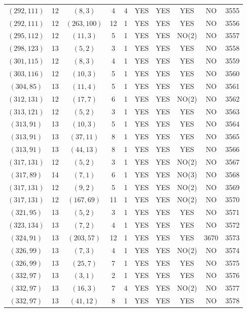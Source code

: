 \begin{longtable}{|c|c|c|c|c|c|c|c|c|c|}
$(292, 111)$ & 12 & $(8, 3)$ & 4 & 4 & YES & YES & YES & NO & 3555\\
$(292, 111)$ & 12 & $(263, 100)$ & 12 & 1 & YES & YES & YES & NO & 3556\\
$(295, 112)$ & 12 & $(11, 3)$ & 5 & 1 & YES & YES & NO(2) & NO & 3557\\
$(298, 123)$ & 13 & $(5, 2)$ & 3 & 1 & YES & YES & YES & NO & 3558\\
$(301, 115)$ & 12 & $(8, 3)$ & 4 & 1 & YES & YES & YES & NO & 3559\\
$(303, 116)$ & 12 & $(10, 3)$ & 5 & 1 & YES & YES & YES & NO & 3560\\
$(304, 85)$ & 13 & $(11, 4)$ & 5 & 1 & YES & YES & YES & NO & 3561\\
$(312, 131)$ & 12 & $(17, 7)$ & 6 & 1 & YES & YES & NO(2) & NO & 3562\\
$(313, 121)$ & 12 & $(5, 2)$ & 3 & 1 & YES & YES & YES & NO & 3563\\
$(313, 91)$ & 13 & $(10, 3)$ & 5 & 1 & YES & YES & YES & NO & 3564\\
$(313, 91)$ & 13 & $(37, 11)$ & 8 & 1 & YES & YES & YES & NO & 3565\\
$(313, 91)$ & 13 & $(44, 13)$ & 8 & 1 & YES & YES & YES & NO & 3566\\
$(317, 131)$ & 12 & $(5, 2)$ & 3 & 1 & YES & YES & NO(2) & NO & 3567\\
$(317, 89)$ & 14 & $(7, 1)$ & 6 & 1 & YES & YES & NO(3) & NO & 3568\\
$(317, 131)$ & 12 & $(9, 2)$ & 5 & 1 & YES & YES & NO(2) & NO & 3569\\
$(317, 131)$ & 12 & $(167, 69)$ & 11 & 1 & YES & YES & NO(2) & NO & 3570\\
$(321, 95)$ & 13 & $(5, 2)$ & 3 & 1 & YES & YES & YES & NO & 3571\\
$(323, 134)$ & 13 & $(7, 2)$ & 4 & 1 & YES & YES & YES & NO & 3572\\
$(324, 91)$ & 13 & $(203, 57)$ & 12 & 1 & YES & YES & YES & 3670 & 3573\\
$(326, 99)$ & 13 & $(7, 3)$ & 4 & 1 & YES & YES & NO(2) & NO & 3574\\
$(326, 99)$ & 13 & $(25, 7)$ & 7 & 1 & YES & YES & YES & NO & 3575\\
$(332, 97)$ & 13 & $(3, 1)$ & 2 & 1 & YES & YES & YES & NO & 3576\\
$(332, 97)$ & 13 & $(16, 3)$ & 7 & 4 & YES & YES & NO(2) & NO & 3577\\
$(332, 97)$ & 13 & $(41, 12)$ & 8 & 1 & YES & YES & YES & NO & 3578\\

\end{longtable}
